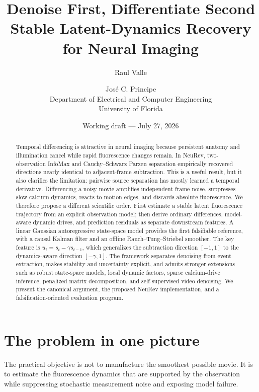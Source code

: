 \documentclass[11pt]{article}
\title{\textbf{Denoise First, Differentiate Second}\\
Stable Latent-Dynamics Recovery for Neural Imaging}
\author{
Raul Valle \and Jos\'e C. Principe\\
Department of Electrical and Computer Engineering\\
University of Florida
}
\date{Working draft --- July 27, 2026}
\begin{document}
\maketitle

\begin{abstract}
Temporal differencing is attractive in neural imaging because persistent anatomy
and illumination cancel while rapid fluorescence changes remain. In NeuRev,
two-observation InfoMax and Cauchy--Schwarz Parzen separation empirically
recovered directions nearly identical to adjacent-frame subtraction. This is a
useful result, but it also clarifies the limitation: pairwise source separation
has mostly learned a temporal derivative. Differencing a noisy movie amplifies
independent frame noise, suppresses slow calcium dynamics, reacts to motion
edges, and discards absolute fluorescence. We therefore propose a different
scientific order. First estimate a stable latent fluorescence trajectory from an
explicit observation model; then derive ordinary differences, model-aware
dynamic drives, and prediction residuals as separate downstream features. A
linear Gaussian autoregressive state-space model provides the first falsifiable
reference, with a causal Kalman filter and an offline Rauch--Tung--Striebel
smoother. The key feature is
\(u_t=s_t-\gamma s_{t-1}\), which generalizes the subtraction direction
\([-1,1]\) to the dynamics-aware direction \([-\gamma,1]\). The framework
separates denoising from event extraction, makes stability and uncertainty
explicit, and admits stronger extensions such as robust state-space models,
local dynamic factors, sparse calcium-drive inference, penalized matrix
decomposition, and self-supervised video denoising. We present the canonical
argument, the proposed NeuRev implementation, and a falsification-oriented
evaluation program.
\end{abstract}

\section{The problem in one picture}

The practical objective is not to manufacture the smoothest possible movie. It
is to estimate the fluorescence dynamics that are supported by the observation
while suppressing stochastic measurement noise and exposing model failure.
\end{document}
